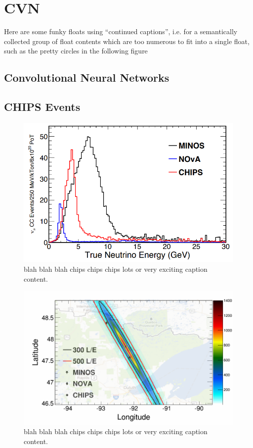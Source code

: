 \chapter{CVN}
\label{chap:cvn}

Here are some funky floats using ``continued captions'', i.e. for a semantically
collected group of float contents which are too numerous to fit into a single
float, such as the pretty circles in the following figure

\section{Convolutional Neural Networks}
\label{sec:cnn}

\section{CHIPS Events}
\label{sec:events}

\begin{figure}
    \includegraphics[width=\largefigwidth]{diagrams/cvn/numi_axis}
    \caption[numi_axis]%
    {blah blah blah chips chips chips lots or very exciting caption content.}
    \label{fig:numi_axis}
\end{figure}

\begin{figure}
    \includegraphics[width=\largefigwidth]{diagrams/cvn/numi_map}
    \caption[numi_map]%
    {blah blah blah chips chips chips lots or very exciting caption content.}
    \label{fig:numi_map}
\end{figure}

